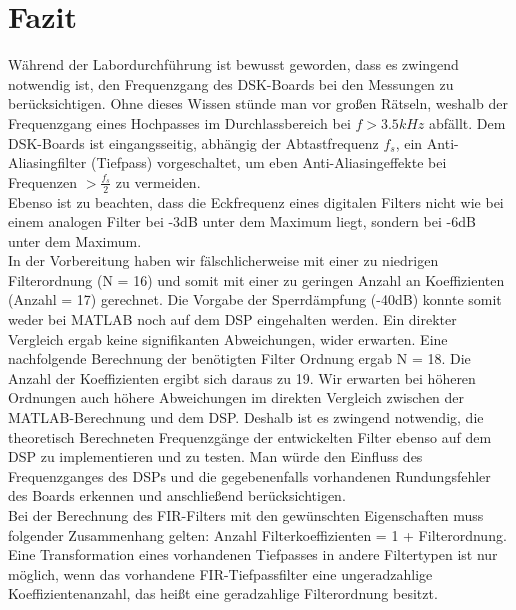 \section{Fazit}
\noindent Während der Labordurchführung ist bewusst geworden, dass es zwingend notwendig ist, den Frequenzgang des DSK-Boards bei den Messungen zu berücksichtigen. Ohne dieses Wissen stünde man vor großen Rätseln, weshalb der Frequenzgang eines Hochpasses im Durchlassbereich bei $f>3.5kHz$ abfällt. Dem DSK-Boards ist eingangsseitig, abhängig der Abtastfrequenz $f_s$, ein Anti-Aliasingfilter (Tiefpass) vorgeschaltet, um eben Anti-Aliasingeffekte bei Frequenzen $>\frac{f_s}{2}$ zu vermeiden.\\
\noindent Ebenso ist zu beachten, dass die Eckfrequenz eines digitalen Filters nicht wie bei einem analogen Filter bei -3dB unter dem Maximum liegt, sondern bei -6dB unter dem Maximum.\\
\noindent In der Vorbereitung haben wir fälschlicherweise mit einer zu niedrigen Filterordnung (N = 16) und somit mit einer zu geringen Anzahl an Koeffizienten (Anzahl = 17) gerechnet. Die Vorgabe der Sperrdämpfung (-40dB) konnte somit weder bei MATLAB noch auf dem DSP eingehalten werden. Ein direkter Vergleich ergab keine signifikanten Abweichungen, wider erwarten. Eine nachfolgende Berechnung der benötigten Filter Ordnung ergab N = 18. Die Anzahl der Koeffizienten ergibt sich daraus zu 19. Wir erwarten bei höheren Ordnungen auch höhere Abweichungen im direkten Vergleich zwischen der MATLAB-Berechnung und dem DSP. Deshalb ist es zwingend notwendig, die theoretisch Berechneten Frequenzgänge der entwickelten Filter ebenso auf dem DSP zu implementieren und zu testen. Man würde den Einfluss des Frequenzganges des DSPs und die gegebenenfalls vorhandenen Rundungsfehler des Boards erkennen und anschließend berücksichtigen.\\
\noindent Bei der Berechnung des FIR-Filters mit den gewünschten Eigenschaften muss folgender Zusammenhang gelten: Anzahl Filterkoeffizienten = 1 + Filterordnung. Eine Transformation eines vorhandenen Tiefpasses in andere Filtertypen ist nur möglich, wenn das vorhandene FIR-Tiefpassfilter eine ungeradzahlige Koeffizientenanzahl, das heißt eine geradzahlige Filterordnung besitzt.\\
